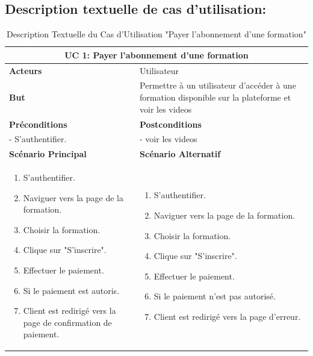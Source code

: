 \subsection{Description textuelle de cas d’utilisation: }
\begin{table}[h!]
\centering
\begin{tabular}{| m{7cm} | m{7cm} |}
\hline
\multicolumn{2}{|c|}{\textbf{UC 1:} Payer l'abonnement d'une formation} \\ \hline
\textbf{Acteurs} &  Utilisateur \\ \hline
\textbf{But} &   Permettre à un utilisateur d'accéder à une formation disponible sur la plateforme et voir les videos \\ \hline
 \textbf{Préconditions} 
& 
\textbf{Postconditions} \\ \hline
- S'authentifier. & - voir les videos\\ \hline
\textbf{Scénario Principal} & \textbf{Scénario Alternatif}
\\ \hline
\begin{enumerate}
    \item S'authentifier.
    \item Naviguer vers la page de la formation.
    \item Choisir la formation.
    \item Clique sur "S'inscrire".
    \item Effectuer le paiement.
    \item Si le paiement est autoris.
    \item Client est redirigé vers la page de confirmation de paiement.
\end{enumerate} & 
\begin{enumerate}
    \item S'authentifier.
    \item Naviguer vers la page de la formation.
    \item Choisir la formation.
    \item Clique sur "S'inscrire".
    \item Effectuer le paiement.
    \item Si le paiement n'est pas autorisé.
    \item Client est redirigé vers la page d’erreur.
\end{enumerate}
\\ \hline
\end{tabular}
\caption{Description Textuelle du Cas d'Utilisation "Payer l'abonnement d'une formation"}
\label{tab:use_case_description}
\end{table}


